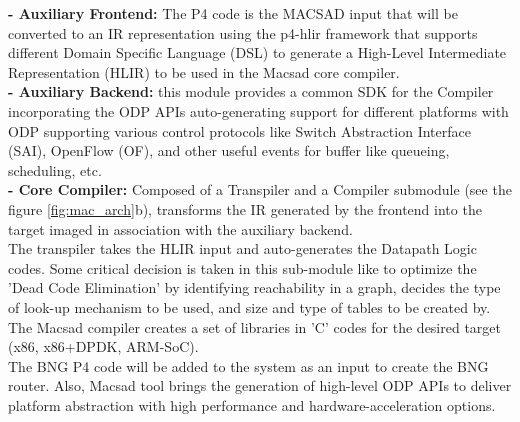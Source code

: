 \textbf{- Auxiliary Frontend:} The P4 code is the MACSAD input that will be converted to an IR representation using the  p4-hlir framework that supports different Domain Specific Language (DSL) to generate a High-Level Intermediate Representation (HLIR) to be used in the Macsad core compiler.\\
\textbf{- Auxiliary Backend:} this module provides a common SDK for the Compiler incorporating the ODP APIs 
 auto-generating support for different platforms with ODP supporting various control protocols like Switch Abstraction Interface (SAI), OpenFlow (OF), and other useful events for buffer like queueing, scheduling, etc.\\
\textbf{- Core Compiler:} Composed of a Transpiler and a Compiler submodule (see the figure \ref{fig:mac_arch}b), transforms the IR generated by the frontend into the target imaged in association with the auxiliary backend.\\
The transpiler takes the HLIR input and auto-generates the Datapath Logic codes. Some critical decision is taken in this sub-module like to optimize the ’Dead Code Elimination’ by identifying reachability in a graph, decides the type of look-up mechanism to be used, and size and type of tables to be created by. 
The Macsad compiler creates a set of libraries in 'C' codes for the desired target (x86, x86+DPDK, ARM-SoC).\\
The BNG P4 code will be added to the system as an input to create the BNG router. Also, Macsad tool brings the generation of high-level ODP APIs to deliver platform abstraction with high performance and hardware-acceleration options.



